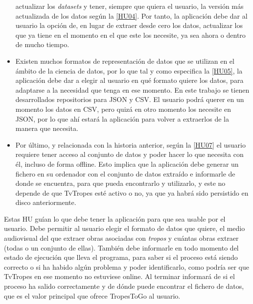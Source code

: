 \begin{itemize}
    actualizar los \textit{datasets} y tener, siempre que quiera el usuario, la
    versión más actualizada de los datos según la
    \href{https://github.com/jlgallego99/TropesToGo/issues/9}{[HU04]}. Por
    tanto, la aplicación debe dar al usuario la opción de, en lugar de extraer
    desde cero los datos, actualizar los que ya tiene en el momento en el que
    este los necesite, ya sea ahora o dentro de mucho tiempo.
    \item Existen muchos formatos de representación de datos que se utilizan en
    el ámbito de la ciencia de datos, por lo que tal y como especifica la
    \href{https://github.com/jlgallego99/TropesToGo/issues/30}{[HU05]}, la
    aplicación debe dar a elegir al usuario en qué formato quiere los datos,
    para adaptarse a la necesidad que tenga en ese momento. En este trabajo se
    tienen desarrollados repositorios para JSON y CSV. El usuario podrá querer
    en un momento los datos en CSV, pero quizá en otro momento los necesite en
    JSON, por lo que ahí estará la aplicación para volver a extraerlos de la
    manera que necesita.
    \item Por último, y relacionada con la historia anterior, según la
    \href{https://github.com/jlgallego99/TropesToGo/issues/46}{[HU07]} el
    usuario requiere tener acceso al conjunto de datos y poder hacer lo que
    necesita con él, incluso de forma offline. Esto implica que la aplicación
    debe generar un fichero en su ordenador con el conjunto de datos extraído e
    informarle de donde se encuentra, para que pueda encontrarlo y utilizarlo, y
    este no depende de que TvTropes esté activo o no, ya que ya habrá sido
    persistido en disco anteriormente.
\end{itemize}

Estas HU guían lo que debe tener la aplicación para que sea usable por el
usuario. Debe permitir al usuario elegir el formato de datos que quiere, el
medio audiovisual del que extraer obras asociadas con \textit{tropos} y cuántas
obras extraer (todas o un conjunto de ellas). También debe informarle en todo
momento del estado de ejecución que lleva el programa, para saber si el proceso
está siendo correcto o si ha habido algún problema y poder identificarlo, como
podría ser que TvTropes en ese momento no estuviese online. Al terminar
informará de si el proceso ha salido correctamente y de dónde puede encontrar el
fichero de datos, que es el valor principal que ofrece TropesToGo al usuario.

